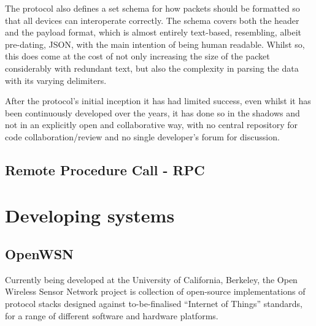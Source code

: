 The protocol also defines a set schema for how packets should be formatted so that all devices can interoperate correctly. The schema covers both the header and the payload format, which is almost entirely text-based, resembling, albeit pre-dating, JSON, with the main intention of being human readable. Whilst so, this does come at the cost of not only increasing the size of the packet considerably with redundant text, but also the complexity in parsing the data with its varying delimiters. 

After the protocol's initial inception it has had limited success, even whilst it has been continuously developed over the years, it has done so in the shadows and not in an explicitly open and collaborative way, with no central repository for code collaboration/review and no single developer's forum for discussion. %

\subsection{Remote Procedure Call - RPC} %
\label{sub:rpc}


\section{Developing systems} %
\label{sec:developing_systems}

\subsection{OpenWSN} %
\label{sub:owsn_berkeley}
Currently being developed at the University of California, Berkeley, the Open Wireless Sensor Network project is collection of open-source implementations of protocol stacks designed against to-be-finalised ``Internet of Things'' standards, for a range of different software and hardware platforms.

